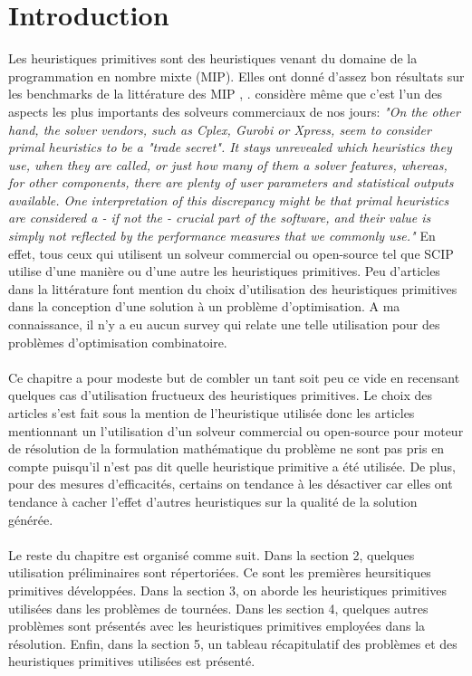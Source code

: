 \documentclass[12pt,a4paper,oneside]{book}
\theoremstyle{definition}
\begin{document}
	\section{Introduction}
	Les heuristiques primitives sont des heuristiques venant du domaine de la programmation en nombre mixte (MIP). Elles ont donné d'assez bon résultats sur les benchmarks de la littérature des MIP \cite{berthold2006}, \cite{Achterberg2012}. \cite{Berthold2013} considère même que c'est l'un des aspects les plus importants des solveurs commerciaux de nos jours: \textit{"On the other hand, the solver vendors, such as Cplex, Gurobi or Xpress, seem to consider primal heuristics to be a "trade secret". It stays unrevealed which heuristics they use, when they are called, or just how many of them a solver features, whereas, for other components, there are plenty of user parameters and statistical outputs available. One interpretation of this discrepancy might be that primal heuristics are considered a - if not the - crucial part of the software, and their value is simply not reflected by the performance measures that we commonly use."} En effet, tous ceux qui utilisent un solveur commercial ou open-source tel que SCIP utilise d'une manière ou d'une autre les heuristiques primitives. Peu d'articles dans la littérature font mention du choix d'utilisation des heuristiques primitives dans la conception d'une solution à un problème d'optimisation. A ma connaissance, il n'y a eu aucun survey qui relate une telle utilisation pour des problèmes d'optimisation combinatoire.
	\paragraph{}
	Ce chapitre a pour modeste but de combler un tant soit peu ce vide en recensant quelques cas d'utilisation fructueux des heuristiques primitives. Le choix des articles s'est fait sous la mention de l'heuristique utilisée donc les articles mentionnant un l'utilisation d'un solveur commercial ou open-source pour moteur de résolution de la formulation mathématique du problème ne sont pas pris en compte puisqu'il n'est pas dit quelle heuristique primitive a été utilisée. De plus, pour des mesures d'efficacités, certains on tendance à les désactiver car elles ont tendance à cacher l'effet d'autres heuristiques sur la qualité de la solution générée. 
	\paragraph{}
	Le reste du chapitre est organisé comme suit. Dans la section 2, quelques utilisation préliminaires sont répertoriées. Ce sont les premières heursitiques primitives développées. Dans la section 3, on aborde les heuristiques primitives utilisées dans les problèmes de tournées. Dans les section 4, quelques autres problèmes sont présentés avec les heuristiques primitives employées dans la résolution. Enfin, dans la section 5, un tableau récapitulatif des problèmes et des heuristiques primitives utilisées est présenté.  
	
\end{document}
